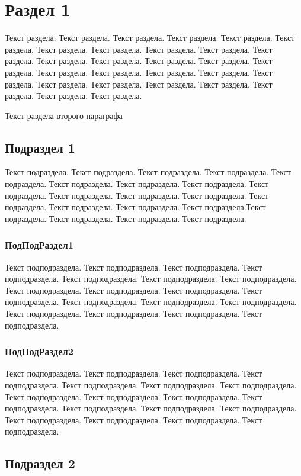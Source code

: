 ﻿\section{Раздел 1}


      Текст раздела. Текст раздела. Текст раздела. Текст раздела. Текст раздела. Текст раздела. Текст раздела. Текст раздела. Текст раздела. Текст раздела. Текст раздела. Текст раздела. Текст раздела. Текст раздела. Текст раздела. Текст раздела. Текст раздела. Текст раздела. Текст раздела. Текст раздела. Текст раздела. Текст раздела. Текст раздела. Текст раздела. Текст раздела. Текст раздела. Текст раздела. Текст раздела.
    

      Текст раздела второго параграфа
    \subsection{Подраздел 1}


      Текст подраздела. Текст подраздела. Текст подраздела. Текст подраздела. Текст подраздела. Текст подраздела. Текст подраздела. Текст подраздела. Текст подраздела. Текст подраздела. Текст подраздела. Текст подраздела. Текст подраздела. Текст подраздела. Текст подраздела. Текст подраздела.Текст подраздела. Текст подраздела. Текст подраздела. Текст подраздела.
    \subsubsection{ПодПодРаздел1}


      Текст подподраздела. Текст подподраздела. Текст подподраздела. Текст подподраздела. Текст подподраздела. Текст подподраздела. Текст подподраздела. Текст подподраздела. Текст подподраздела. Текст подподраздела. Текст подподраздела. Текст подподраздела. Текст подподраздела. Текст подподраздела. Текст подподраздела. Текст подподраздела. Текст подподраздела. Текст подподраздела.
    \subsubsection{ПодПодРаздел2}


      Текст подподраздела. Текст подподраздела. Текст подподраздела. Текст подподраздела. Текст подподраздела. Текст подподраздела. Текст подподраздела. Текст подподраздела. Текст подподраздела. Текст подподраздела. Текст подподраздела. Текст подподраздела. Текст подподраздела. Текст подподраздела. Текст подподраздела. Текст подподраздела. Текст подподраздела. Текст подподраздела.
    \subsection{Подраздел 2}



